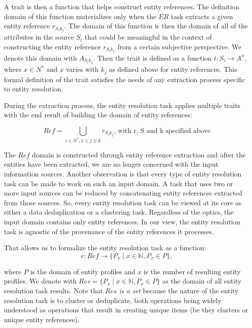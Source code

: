 \documentclass[lettersize,journal]{IEEEtran}
\begin{document}
    A trait is then a function that helps construct entity references.
    The definition domain of this function materializes only when the $ER$ task
    extracts a given entity reference $r_{{S_i}{k_j}}$.
    The domain of this function is then the domain of all of the attributes in
    the source $S_i$ that could be meaningful in the context of constructing the
    entity reference $r_{{S_i}{k_j}}$ from a certain subjective perspective.
    We denote this domain with $A_{{S_i}{k_j}}$.
    Then the trait is defined as a function $t: S_i \rightarrow A^x$, where
    $x \in N^*$ and $x$ varies with $k_j$ as defined above for entity
    references.
    This formal definition of the trait satisfies the needs of any extraction
    process specific to entity resolution.

    During the extraction process, the entity resolution task applies multiple
    traits with the end result of building the domain of entity references:

    \[
        Ref = \bigcup_{i \in N^*,1 \leq j \leq k} r_{{S_i}{k_j}}
        \textrm{, with r, S and k specified above}
    \]

    The $Ref$ domain is constructed through entity reference extraction and
    after the entities have been extracted, we are no longer concerned with the
    input information sources.
    Another observation is that every type of entity resolution task can be made
    to work on such an input domain\cite{Pap19}.
    A task that uses two or more input sources can be reduced by concatenating
    entity references extracted from those sources.
    So, every entity resolution task can be viewed at its core as either a
    data deduplication or a clustering task.
    Regardless of the optics, the input domain contains only entity references.
    In our view, the entity resolution task is agnostic of the provenance of the
    entity references it processes.
    
    That allows us to formalize the entity resolution task as a function:
    \[
        e : Ref \rightarrow \{P_x \mid x \in \mathbb{N}, P_x \in P \},
    \]
    
    where $P$ is the domain of entity profiles and $x$ is the number of
    resulting entity profiles.
    We denote with $Res=\{P_x \mid x \in \mathbb{N}, P_x \in P\}$ as the domain
    of all entity resolution task results.
    Note that $Res$ \textit{is a set} because the nature of the entity
    resolution task is to cluster or deduplicate, both operations being widely
    understood as operations that result in creating unique items (be they
    clusters or unique entity references).
\end{document}
